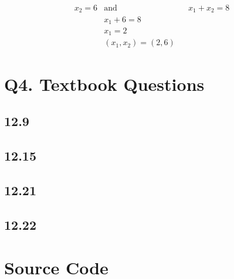 \documentclass{article}
\begin{document}
    \begin{align*}
        & x_2 = 6 & \text{and}& & x_1 + x_2 = 8 & \\
        & & x_1 + 6 = 8 \\
        & & x_1 = 2 \\
        & & (x_1, x_2) = (2, 6)
    \end{align*}

    \section{Q4. Textbook Questions}

    \subsection{12.9}

    \subsection{12.15}

    \subsection{12.21}

    \subsection{12.22}


    \newpage
    \appendix

    \section{Source Code}
\end{document}
